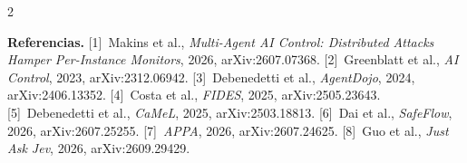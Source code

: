 \documentclass[9pt,letterpaper]{extarticle}
\newcommand{\lead}[1]{\textbf{#1}}
\begin{document}
\begin{multicols*}{2}
{\lead{Referencias.}
[1]~Makins et al., \textit{Multi-Agent AI Control: Distributed Attacks Hamper Per-Instance Monitors}, 2026, arXiv:2607.07368.
[2]~Greenblatt et al., \textit{AI Control}, 2023, arXiv:2312.06942.
[3]~Debenedetti et al., \textit{AgentDojo}, 2024, arXiv:2406.13352.
[4]~Costa et al., \textit{FIDES}, 2025, arXiv:2505.23643.
[5]~Debenedetti et al., \textit{CaMeL}, 2025, arXiv:2503.18813.
[6]~Dai et al., \textit{SafeFlow}, 2026, arXiv:2607.25255.
[7]~\textit{APPA}, 2026, arXiv:2607.24625.
[8]~Guo et al., \textit{Just Ask Jev}, 2026, arXiv:2609.29429.
\par}

\end{multicols*}
\end{document}

